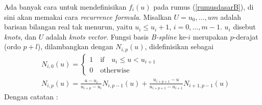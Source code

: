 Ada banyak cara untuk mendefinisikan $f_{i}(u)$ 
pada rumus (\ref{rumusdasarB}), di sini akan memakai 
cara \textit{recurrence formula}. Misalkan $U = {u_0, \dots, um}$ 
adalah barisan bilangan real tak menurun, yaitu 
$u_i \leq u_i+1$, $i = 0, \dots, m - 1$. $u_i$ disebut 
\textit{knots}, dan $U$ adalah \textit{knots vector}. 
Fungsi basis \textit{B-spline} ke-$i$ merupakan $p$-derajat 
(ordo $p+l$), dilambangkan dengan $N_{i,p}(u)$, 
didefinisikan sebagai
\begin{equation}
	\begin{split}
	&N_{i,0}(u) = \begin{cases}
		1 \quad \text{if} \quad u_i \leq u < u_{i+1} \\
		0 \quad \text{otherwise}
	\end{cases}
	\\
	&N_{i,p}(u) = \frac{u - u_i}{u_{i+p} - u_i}N_{i,p-1}(u) + \frac{u_{i+p+1} - u}{u_{i+p+1} - u_{i+1}}N_{i+1,p-1}(u)
	\label{rumusdasarN}
	\end{split}
\end{equation}
Dengan catatan :

